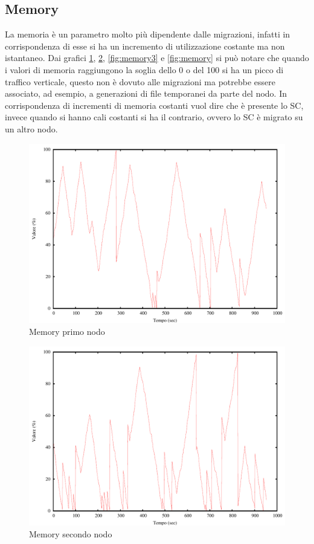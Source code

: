 \subsection{Memory}
La memoria è un parametro molto più dipendente dalle migrazioni, infatti in corrispondenza di esse si ha un incremento di utilizzazione costante ma non istantaneo. Dai grafici \ref{fig:memory1}, \ref{fig:memory2}, \ref{fig:memory3} e \ref{fig:memory} si può notare che quando i valori di memoria raggiungono la soglia dello 0 o del 100 si ha un picco di traffico verticale, questo non è dovuto alle migrazioni ma potrebbe essere associato, ad esempio, a generazioni di file temporanei da parte del nodo. In corrispondenza di incrementi di memoria costanti vuol dire che è presente lo SC, invece quando si hanno cali costanti si ha il contrario, ovvero lo SC è migrato su un altro nodo.
\begin{figure}[H]
\begin{center}
\includegraphics[scale=0.6]{etc/memory1.pdf}
\caption{Memory primo nodo}
\label{fig:memory1}
\end{center}
\end{figure}
\begin{figure}[H]
\begin{center}
\includegraphics[scale=0.6]{etc/memory2.pdf}
\caption{Memory secondo nodo}
\label{fig:memory2}
\end{center}
\end{figure}
